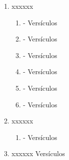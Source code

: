 \documentclass[9pt,letterpaper]{article}
\begin{document}
\begin{enumerate}
\begin{enumerate}
		\end{enumerate}
		\item xxxxxx
		\begin{enumerate}
			\item  - Versículos  
			\item  - Versículos 
			\item  - Versículos 
			\item  - Versículos 
			\item  - Versículos 
			\item  - Versículos 
		\end{enumerate}
		\item xxxxxx
		\begin{enumerate}
			\item  - Versículos 
		\end{enumerate}
		\item xxxxxx Versículos 
	\end{enumerate}
\end{document}
